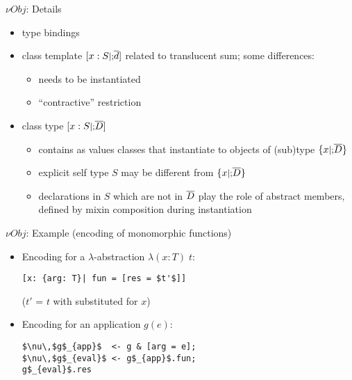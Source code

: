 \documentclass{beamer}
\begin{document}
\begin{frame}{${\nu}Obj$: Details}
\begin{itemize}
\item type bindings
\item class template $[x: S \mbox{\small $|;$} \overline d]$ related to translucent sum; some differences:
\begin{itemize}
\item needs to be instantiated
\item ``contractive'' restriction
\end{itemize}
\item class type $[x: S \mbox{\small $|;$} \overline D]$
\begin{itemize}
\item contains as values classes that instantiate to objects of (sub)type $\{x \mbox{\small $|;$} \overline D\}$
\item explicit self type $S$ may be different from $\{x \mbox{\small $|;$} \overline D\}$
\item declarations in $S$ which are not in $\overline D$ play the role of abstract members, defined by mixin composition during instantiation
\end{itemize}
\end{itemize}
\end{frame}

\begin{frame}[fragile]{${\nu}Obj$: Example (encoding of monomorphic functions)}
\begin{itemize}
\item Encoding for a $\lambda$-abstraction $\lambda ( x : T )\; t$:
\begin{lstlisting}[basicstyle=\large]
[x: {arg: T}| fun = [res = $t'$]]
\end{lstlisting}
($t'$ = $t$ with  substituted for $x$)

\item Encoding for an application $g(e)$:
\begin{lstlisting}[basicstyle=\large]
$\nu\,$g$_{app}$  <- g & [arg = e];
$\nu\,$g$_{eval}$ <- g$_{app}$.fun;
g$_{eval}$.res
\end{lstlisting}
\end{itemize}
\end{frame}
\end{document}

